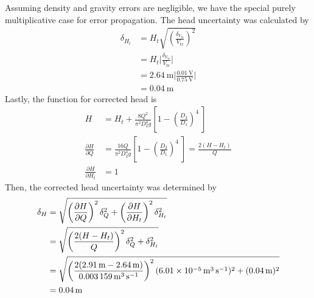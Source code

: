 Assuming density and gravity errors are negligible, we have the special purely multiplicative case for error propagation. The head uncertainty was calculated by
\begin{align*}
    \delta_{H_t} &= H_t \sqrt{\left(\frac{\delta_{V_{\text{tr}}}}{V_{\text{tr}}}\right)^2} \\
    &= H_t \bigg|\frac{\delta_{V_{\text{tr}}}}{V_{\text{tr}}}\bigg| \\
    &= \qty{2.64}{\meter} \bigg|\frac{\qty{0.01}{\volt}}{\qty{0.75}{\volt}}\bigg| \\
    &= \qty{0.04}{\meter}
\end{align*}
Lastly, the function for corrected head is
\begin{align*}
    H &= H_t + \frac{8Q^2}{\pi^2 D_2^4 g} \left[1 - \left(\frac{D_2}{D_1}\right)^4\ \right] \\
    \frac{\partial H}{\partial Q} &= \frac{16Q}{\pi^2 D_2^4 g}\left[1 - \left(\frac{D_2}{D_1}\right)^4\ \right] = \frac{2(H - H_t)}{Q} \\
    \frac{\partial H}{\partial H_t} &= 1 
\end{align*}
Then, the corrected head uncertainty was determined by
\begin{align*}
    \delta_{H} &= \sqrt{\left(\frac{\partial H}{\partial Q}\right)^2 \delta_Q^2 + \left(\frac{\partial H}{\partial H_t}\right)^2 \delta_{H_t}^2} \\
    &= \sqrt{\left(\frac{2(H - H_t)}{Q}\right)^2 \delta_Q^2 + \delta_{H_t}^2} \\
    &= \sqrt{\left(\frac{2(\qty{2.91}{\meter} - \qty{2.64}{\meter})}{\qty{0.003159}{\meter\cubed\per\second}}\right)^2 (\qty{6.01E-05}{\meter\cubed\per\second})^2 + (\qty{0.04}{\meter})^2} \\
    &= \qty{0.04}{\meter}
\end{align*}

